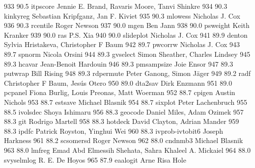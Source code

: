    933     90.5    itpscore      Jennie E. Brand, Ravaris Moore, Tanvi   
                                   Shinkre                                 
   934     90.3    kinkyreg      Sebastian Kripfganz, Jan F. Kiviet      
   935     90.3    mlowess       Nicholas J. Cox                         
   936     90.3    rcentile      Roger Newson                            
   937     90.0    mgen          Ben Jann                                
   938     90.0    psweight      Keith Kranker                           
   939     90.0    ras           P.S. Xia                                
   940     90.0    slideplot     Nicholas J. Cox                         
   941     89.9    denton        Sylvia Hristakeva, Christopher F Baum   
   942     89.7    pwcorrw       Nicholas J. Cox                         
   943     89.7    spnorm        Nicola Orsini                           
   944     89.3    gvselect      Simon Sheather, Charles Lindsey         
   945     89.3    hcavar        Jean-Benoit Hardouin                    
   946     89.3    pmsampsize    Joie Ensor                              
   947     89.3    putwrap       Bill Rising                             
   948     89.3    rdpermute     Peter Ganong, Simon Jäger              
   949     89.2    radf          Christopher F Baum, Jesús Otero        
   950     89.0    dta2sav       Dirk Enzmann                            
   951     89.0    pcpanel       Fiona Burlig, Louis Preonas, Matt       
                                   Woerman                                 
   952     88.7    cpigen        Austin Nichols                          
   953     88.7    estsave       Michael Blasnik                         
   954     88.7    sixplot       Peter Lachenbruch                       
   955     88.5    ivolsdec      Shoya Ishimaru                          
   956     88.3    geocode       Daniel Miles, Adam Ozimek               
   957     88.3    git           Rodrigo Martell                         
   958     88.3    hotdeck       David Clayton, Adrian Mander            
   959     88.3    ipdfc         Patrick Royston, Yinghui Wei            
   960     88.3    ivprob-ivtobit6  Joseph Harkness                         
   961     88.2    scsomersd     Roger Newson                            
   962     88.0    cndnmb3       Michael Blasnik                         
   963     88.0    lmfreg        Emad Abd Elmessih Shehata, Sahra        
                                   Khaleel A. Mickaiel                     
   964     88.0    svyselmlog    R. E. De Hoyos                          
   965     87.9    eaalogit      Arne Risa Hole                          
